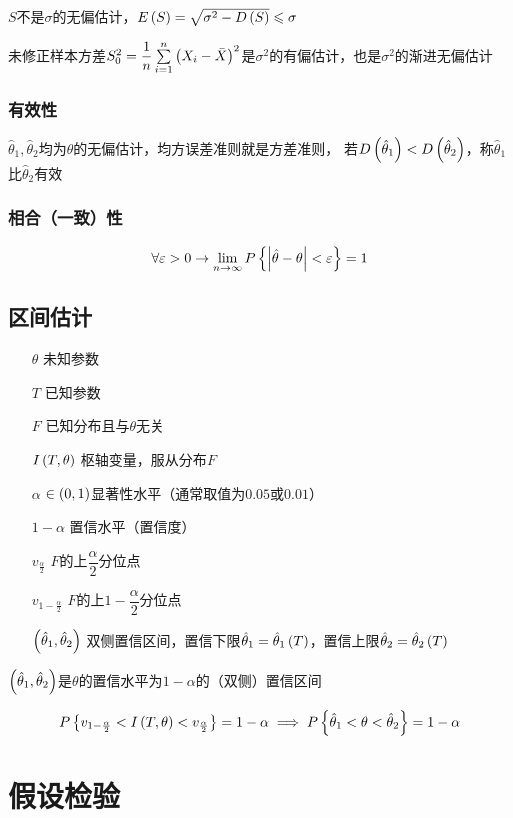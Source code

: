 \documentclass{article}
\begin{document}
$S$不是$\sigma$的无偏估计，$E\left(S\right)=\sqrt{\sigma^2-D\left(S\right)}\leqslant\sigma$

未修正样本方差$S_0^2=\dfrac1n\sum\limits_{i=1}^n{\left(X_i-\bar X\right)}^2$是$\sigma^2$的有偏估计，也是$\sigma^2$的渐进无偏估计

\subsubsection{有效性}

$\hat\theta_1,\hat\theta_2$均为$\theta$的无偏估计，均方误差准则就是方差准则，
若$D\left(\hat\theta_1\right)<D\left(\hat\theta_2\right)$，称$\hat\theta_1$比$\hat\theta_2$有效

\subsubsection{相合（一致）性}

\[\forall\varepsilon>0\to\lim\limits_{n\to\infty}P\left\{\left|\hat\theta-\theta\right|<\varepsilon\right\}=1\]

\subsection{区间估计}

\begin{enumerate}
    \item [$\theta$] 未知参数
    \item [$T$] 已知参数
    \item [$F$] 已知分布且与$\theta$无关
    \item [$I\left(T,\theta\right)$] 枢轴变量，服从分布$F$
    \item [$\alpha$] $\in\left(0,1\right)$显著性水平（通常取值为$0.05$或$0.01$）
    \item [$1-\alpha$] 置信水平（置信度）
    \item [$v_\frac\alpha2$] $F$的上$\dfrac\alpha2$分位点
    \item [$v_{1-\frac\alpha2}$] $F$的上$1-\dfrac\alpha2$分位点
    \item [$\left(\hat\theta_1,\hat\theta_2\right)$] 双侧置信区间，置信下限$\hat\theta_1=\hat\theta_1\left(T\right)$，置信上限$\hat\theta_2=\hat\theta_2\left(T\right)$
\end{enumerate}

$\left(\hat\theta_1,\hat\theta_2\right)$是$\theta$的置信水平为$1-\alpha$的（双侧）置信区间

\[P\left\{v_{1-\frac\alpha2}<I\left(T,\theta\right)<v_\frac\alpha2\right\}=1-\alpha\implies P\left\{\hat\theta_1<\theta<\hat\theta_2\right\}=1-\alpha\]

\section{假设检验}
\end{document}
